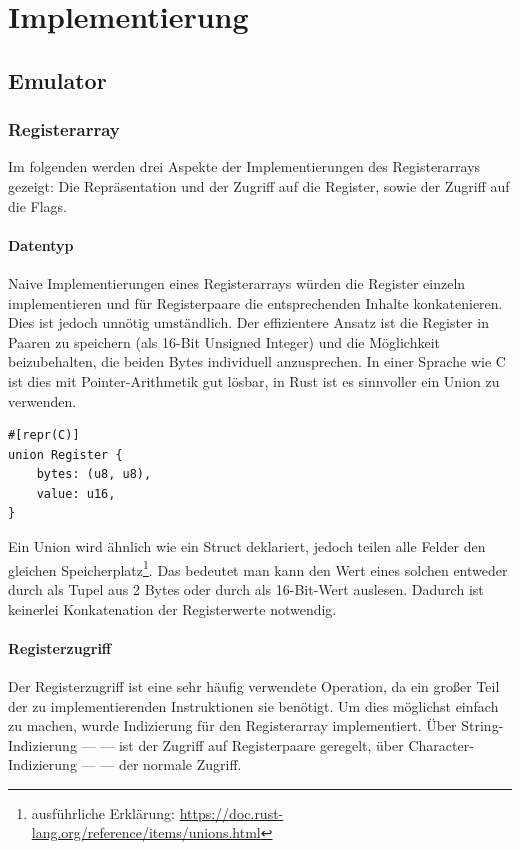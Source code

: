 \chapter{Implementierung}\label{chap:impl}

\section{Emulator}

\subsection{Registerarray}

Im folgenden werden drei Aspekte der Implementierungen des Registerarrays gezeigt: Die Repräsentation und der Zugriff auf die Register, sowie der Zugriff auf die Flags.

\subsubsection{Datentyp}

Naive Implementierungen eines Registerarrays würden die Register einzeln implementieren und für Registerpaare die entsprechenden Inhalte konkatenieren.
Dies ist jedoch unnötig umständlich. Der effizientere Ansatz ist die Register in Paaren zu speichern (als 16-Bit Unsigned Integer) und die Möglichkeit beizubehalten, die beiden Bytes individuell anzusprechen. In einer Sprache wie C ist dies mit Pointer-Arithmetik gut lösbar, in Rust ist es sinnvoller ein Union zu verwenden.

\begin{verbatim}
#[repr(C)]
union Register {
    bytes: (u8, u8),
    value: u16,
}
\end{verbatim}

Ein Union wird ähnlich wie ein Struct deklariert, jedoch teilen alle Felder den gleichen Speicherplatz\footnote{ausführliche Erklärung: \url{https://doc.rust-lang.org/reference/items/unions.html}}. Das bedeutet man kann den Wert eines solchen  entweder durch  als Tupel aus 2 Bytes oder durch  als 16-Bit-Wert auslesen. Dadurch ist keinerlei Konkatenation der Registerwerte notwendig.

\subsubsection{Registerzugriff}

Der Registerzugriff ist eine sehr häufig verwendete Operation, da ein großer Teil der zu implementierenden Instruktionen sie benötigt. Um dies möglichst einfach zu machen, wurde Indizierung für den Registerarray implementiert. Über String-Indizierung ---  --- ist der Zugriff auf Registerpaare geregelt, über Character-Indizierung ---  --- der normale Zugriff.

